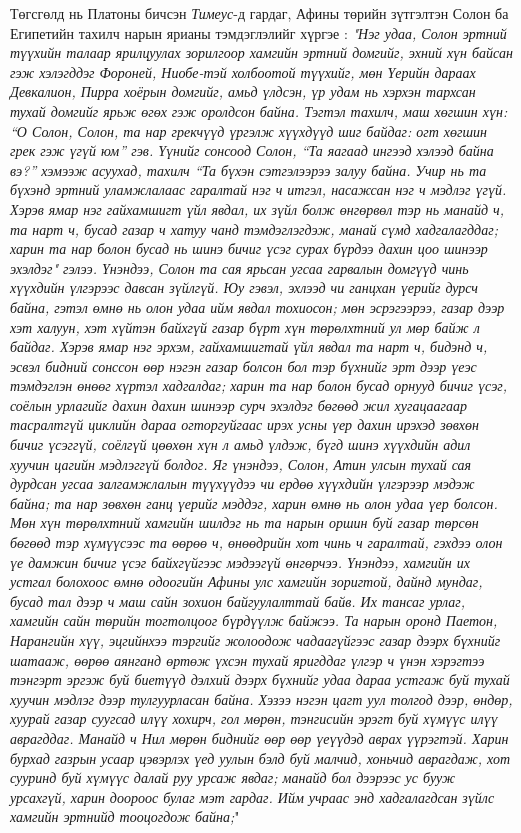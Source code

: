 \documentclass[10pt,twocolumn,letterpaper]{article}
\begin{document}
Төгсгөлд нь Платоны бичсэн \textit{Тимеус}-д гардаг, Афины төрийн зүтгэлтэн Солон ба Египетийн тахилч нарын ярианы тэмдэглэлийг хүргэе \cite{140}: \textit{"Нэг удаа, Солон эртний түүхийн талаар ярилцуулах зорилгоор хамгийн эртний домгийг, эхний хүн байсан гэж хэлэгддэг Фороней, Ниобе-тэй холбоотой түүхийг, мөн Үерийн дараах Девкалион, Пирра хоёрын домгийг, амьд үлдсэн, үр удам нь хэрхэн тархсан тухай домгийг ярьж өгөх гэж оролдсон байна. Тэгтэл тахилч, маш хөгшин хүн: “О Солон, Солон, та нар грекчүүд үргэлж хүүхдүүд шиг байдаг: огт хөгшин грек гэж үгүй юм” гэв. Үүнийг сонсоод Солон, “Та яагаад ингээд хэлээд байна вэ?” хэмээж асуухад, тахилч “Та бүхэн сэтгэлээрээ залуу байна. Учир нь та бүхэнд эртний уламжлалаас гаралтай нэг ч итгэл, насажсан нэг ч мэдлэг үгүй. Хэрэв ямар нэг гайхамшигт үйл явдал, их зүйл болж өнгөрвөл тэр нь манайд ч, та нарт ч, бусад газар ч хатуу чанд тэмдэглэгдэж, манай сүмд хадгалагддаг; харин та нар болон бусад нь шинэ бичиг үсэг сурах бүрдээ дахин цоо шинээр эхэлдэг" гэлээ. Үнэндээ, Солон та сая ярьсан угсаа гарвалын домгүүд чинь хүүхдийн үлгэрээс давсан зүйлгүй. Юу гэвэл, эхлээд чи ганцхан үерийг дурсч байна, гэтэл өмнө нь олон удаа ийм явдал тохиосон; мөн эсрэгээрээ, газар дээр хэт халуун, хэт хүйтэн байхгүй газар бүрт хүн төрөлхтний ул мөр байж л байдаг. Хэрэв ямар нэг эрхэм, гайхамшигтай үйл явдал та нарт ч, бидэнд ч, эсвэл бидний сонссон өөр нэгэн газар болсон бол тэр бүхнийг эрт дээр үеэс тэмдэглэн өнөөг хүртэл хадгалдаг; харин та нар болон бусад орнууд бичиг үсэг, соёлын урлагийг дахин дахин шинээр сурч эхэлдэг бөгөөд жил хугацаагаар тасралтгүй циклийн дараа огторгуйгаас ирэх усны үер дахин ирэхэд зөвхөн бичиг үсэггүй, соёлгүй цөөхөн хүн л амьд үлдэж, бүгд шинэ хүүхдийн адил хуучин цагийн мэдлэггүй болдог. Яг үнэндээ, Солон, Атин улсын тухай сая дурдсан угсаа залгамжлалын түүхүүдээ чи ердөө хүүхдийн үлгэрээр мэдэж байна; та нар зөвхөн ганц үерийг мэддэг, харин өмнө нь олон удаа үер болсон. Мөн хүн төрөлхтний хамгийн шилдэг нь та нарын оршин буй газар төрсөн бөгөөд тэр хүмүүсээс та өөрөө ч, өнөөдрийн хот чинь ч гаралтай, гэхдээ олон үе дамжин бичиг үсэг байхгүйгээс мэдээгүй өнгөрчээ. Үнэндээ, хамгийн их устгал болохоос өмнө одоогийн Афины улс хамгийн зоригтой, дайнд мундаг, бусад тал дээр ч маш сайн зохион байгуулалттай байв. Их тансаг урлаг, хамгийн сайн төрийн тогтолцоог бүрдүүлж байжээ. Та нарын оронд Паетон, Нарангийн хүү, эцгийнхээ тэргийг жолоодож чадаагүйгээс газар дээрх бүхнийг шатааж, өөрөө аянганд өртөж үхсэн тухай яригддаг үлгэр ч үнэн хэрэгтээ тэнгэрт эргэж буй биетүүд дэлхий дээрх бүхнийг удаа дараа устгаж буй тухай хуучин мэдлэг дээр тулгуурласан байна. Хэзээ нэгэн цагт уул толгод дээр, өндөр, хуурай газар суугсад илүү хохирч, гол мөрөн, тэнгисийн эрэгт буй хүмүүс илүү аврагддаг. Манайд ч Нил мөрөн биднийг өөр өөр үеүүдэд аврах үүрэгтэй. Харин бурхад газрын усаар цэвэрлэх үед уулын бэлд буй малчид, хоньчид аврагдаж, хот сууринд буй хүмүүс далай руу урсаж явдаг; манайд бол дээрээс ус бууж урсахгүй, харин доороос булаг мэт гардаг. Ийм учраас энд хадгалагдсан зүйлс хамгийн эртнийд тооцогдож байна;}"
\end{document}
